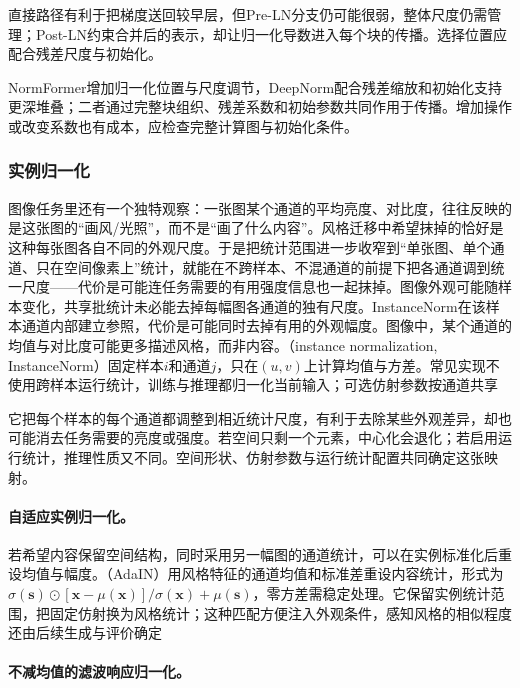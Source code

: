 直接路径有利于把梯度送回较早层，但Pre-LN分支仍可能很弱，整体尺度仍需管理；Post-LN约束合并后的表示，却让归一化导数进入每个块的传播。选择位置应配合残差尺度与初始化。

NormFormer增加归一化位置与尺度调节，DeepNorm配合残差缩放和初始化支持更深堆叠；二者通过完整块组织、残差系数和初始参数共同作用于传播。增加操作或改变系数也有成本，应检查完整计算图与初始化条件。

\subsubsection{实例归一化}
\label{sec:training-instancenorm}
\label{sec:training-adaptive-instancenorm}
\label{sec:training-frn-pixelnorm}
\label{sec:training-frn}
图像任务里还有一个独特观察：一张图某个通道的平均亮度、对比度，往往反映的是这张图的“画风/光照”，而不是“画了什么内容”。风格迁移中希望抹掉的恰好是这种每张图各自不同的外观尺度。于是把统计范围进一步收窄到“单张图、单个通道、只在空间像素上”统计，就能在不跨样本、不混通道的前提下把各通道调到统一尺度——代价是可能连任务需要的有用强度信息也一起抹掉。图像外观可能随样本变化，共享批统计未必能去掉每幅图各通道的独有尺度。InstanceNorm在该样本通道内部建立参照，代价是可能同时去掉有用的外观幅度。图像中，某个通道的均值与对比度可能更多描述风格，而非内容。（instance normalization, InstanceNorm）固定样本$i$和通道$j$，只在$(u,v)$上计算均值与方差。常见实现不使用跨样本运行统计，训练与推理都归一化当前输入；可选仿射参数按通道共享

它把每个样本的每个通道都调整到相近统计尺度，有利于去除某些外观差异，却也可能消去任务需要的亮度或强度。若空间只剩一个元素，中心化会退化；若启用运行统计，推理性质又不同。空间形状、仿射参数与运行统计配置共同确定这张映射。

\paragraph{自适应实例归一化。}

若希望内容保留空间结构，同时采用另一幅图的通道统计，可以在实例标准化后重设均值与幅度。（AdaIN）用风格特征的通道均值和标准差重设内容统计，形式为$\sigma(\bm s)\odot[\bm x-\mu(\bm x)]/\sigma(\bm x)+\mu(\bm s)$，零方差需稳定处理。它保留实例统计范围，把固定仿射换为风格统计；这种匹配方便注入外观条件，感知风格的相似程度还由后续生成与评价确定

\paragraph{不减均值的滤波响应归一化。}

